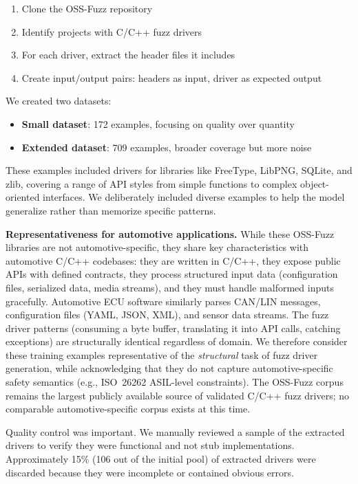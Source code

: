 \begin{enumerate}
    \item Clone the OSS-Fuzz repository
    \item Identify projects with C/C++ fuzz drivers
    \item For each driver, extract the header files it includes
    \item Create input/output pairs: headers as input, driver as expected output
\end{enumerate}

We created two datasets:
\begin{itemize}
    \item \textbf{Small dataset}: 172 examples, focusing on quality over quantity
    \item \textbf{Extended dataset}: 709 examples, broader coverage but more noise
\end{itemize}

These examples included drivers for libraries like FreeType, LibPNG, SQLite, and zlib, covering a range of API styles from simple functions to complex object-oriented interfaces. We deliberately included diverse examples to help the model generalize rather than memorize specific patterns.

\textbf{Representativeness for automotive applications.} While these OSS-Fuzz libraries are not automotive-specific, they share key characteristics with automotive C/C++ codebases: they are written in C/C++, they expose public APIs with defined contracts, they process structured input data (configuration files, serialized data, media streams), and they must handle malformed inputs gracefully. Automotive ECU software similarly parses CAN/LIN messages, configuration files (YAML, JSON, XML), and sensor data streams. The fuzz driver patterns (consuming a byte buffer, translating it into API calls, catching exceptions) are structurally identical regardless of domain. We therefore consider these training examples representative of the \emph{structural} task of fuzz driver generation, while acknowledging that they do not capture automotive-specific safety semantics (e.g., ISO~26262 ASIL-level constraints). The OSS-Fuzz corpus remains the largest publicly available source of validated C/C++ fuzz drivers; no comparable automotive-specific corpus exists at this time.

Quality control was important. We manually reviewed a sample of the extracted drivers to verify they were functional and not stub implementations. Approximately 15\% (106 out of the initial pool) of extracted drivers were discarded because they were incomplete or contained obvious errors.

